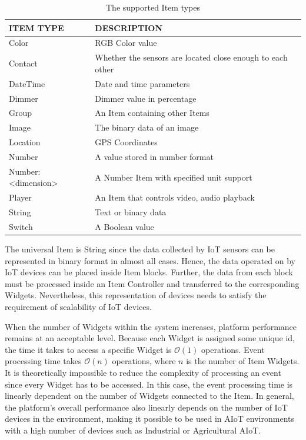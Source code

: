 \begin{table}
  \centering
  \begin{threeparttable}[c]
    \caption{The supported Item types}
    \label{tab:items-table}
    \begin{tabular}{ll}
      \toprule
      ITEM TYPE    &         DESCRIPTION                 \\
      \midrule
      Color &	RGB Color value \\
      Contact & Whether the sensors are located close enough to each other \\
      DateTime & Date and time parameters \\
      Dimmer &	Dimmer value in percentage \\
      Group &	An Item containing other Items \\
      Image &	The binary data of an image \\
      Location & GPS Coordinates \\
      Number & A value stored in number format \\
      Number:<dimension> & A Number Item with specified unit support \\
      Player & An Item that controls video, audio playback \\
      String & Text or binary data \\
      Switch & A Boolean value \\
      \bottomrule
    \end{tabular}
  \end{threeparttable}
\end{table}

The universal Item is String since the data collected by IoT sensors can be represented in binary format in almost all cases. Hence, the data operated on by IoT devices can be placed inside Item blocks. Further, the data from each block must be processed inside an Item Controller and transferred to the corresponding Widgets. Nevertheless, this representation of devices needs to satisfy the requirement of scalability of IoT devices.

When the number of Widgets within the system increases, platform performance remains at an acceptable level. Because each Widget is assigned some unique id, the time it takes to access a specific Widget is $\mathcal{O}(1)$ operations. Event processing time takes $\mathcal{O}(n)$ operations, where $n$ is the number of Item Widgets. It is theoretically impossible to reduce the complexity of processing an event since every Widget has to be accessed. In this case, the event processing time is linearly dependent on the number of Widgets connected to the Item. In general, the platform's overall performance also linearly depends on the number of IoT devices in the environment, making it possible to be used in AIoT environments with a high number of devices such as Industrial or Agricultural AIoT.

